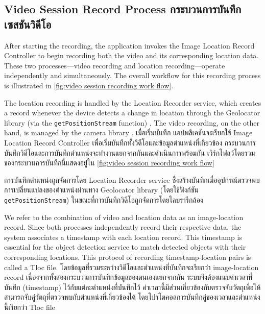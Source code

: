 \subsection{\ifenglish Video Session Record Process \else กระบวนการบันทึกเซสชันวิดีโอ \fi}

\ifenglish
After starting the recording, the application invokes the Image Location Record Controller to begin recording both the video and its corresponding location data. These two processes—video recording and location recording—operate independently and simultaneously. The overall workflow for this recording process is illustrated in \autoref{fig:video session recording work flow}. 

The location recording is handled by the Location Recorder service, which creates a record whenever the device detects a change in location through the Geolocator library (via the \texttt{getPositionStream} function) \cite{geolocator-doc}. The video recording, on the other hand, is managed by the camera library \cite{camera-doc}.
\else
เมื่อเริ่มบันทึก แอปพลิเคชันจะเรียกใช้ Image Location Record Controller เพื่อเริ่มบันทึกทั้งวิดีโอและข้อมูลตำแหน่งที่เกี่ยวข้อง กระบวนการบันทึกวิดีโอและการบันทึกตำแหน่งจะทำงานแยกจากกันและดำเนินการพร้อมกัน เวิร์กโฟลว์โดยรวมของกระบวนการบันทึกนี้แสดงอยู่ใน \autoref{fig:video session recording work flow} 

การบันทึกตำแหน่งถูกจัดการโดย Location Recorder service ซึ่งสร้างบันทึกเมื่ออุปกรณ์ตรวจพบการเปลี่ยนแปลงของตำแหน่งผ่านทาง Geolocator library (โดยใช้ฟังก์ชัน \texttt{getPositionStream}) \cite{geolocator-doc} ในขณะที่การบันทึกวิดีโอถูกจัดการโดยไลบรารีกล้อง \cite{camera-doc}
\fi

\ifenglish
We refer to the combination of video and location data as an image-location record. Since both processes independently record their respective data, the system associates a timestamp with each location record. This timestamp is essential for the object detection service to match detected objects with their corresponding locations. This protocol of recording timestamp-location pairs is called a Tloc file.
\else
โดยข้อมูลที่รวมระหว่างวิดีโอและตำแหน่งที่บันทึกจะเรียกว่า image-location record เนื่องจากทั้งสองกระบวนการบันทึกข้อมูลของตนเองแยกจากกัน ระบบจึงต้องแนบค่าเวลาที่บันทึก (timestamp) ไว้กับแต่ละตำแหน่งที่บันทึกไว้ ค่าเวลานี้มีส่วนเกี่ยวข้องกับตรวจจับวัตถุเพื่อให้สามารถจับคู่วัตถุที่ตรวจพบกับตำแหน่งที่เกี่ยวข้องได้ โดยโปรโตคอลการบันทึกคู่ของเวลาและตำแหน่งนี้เรียกว่า Tloc file
\fi


